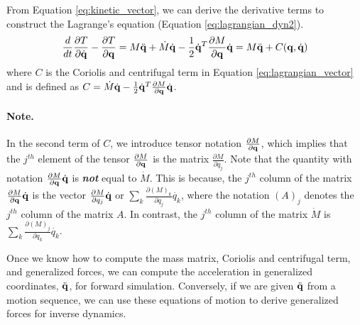 From Equation \ref{eq:kinetic_vector}, we can derive the derivative
terms to construct the Lagrange's equation (Equation
\ref{eq:lagrangian_dyn2}).
\begin{equation}
\frac{d}{dt}\frac{\partial T}{\partial \dot{\mathbf{q}}} - \frac{\partial
  T}{\partial \mathbf{q}} = M\ddot{\mathbf{q}} + \dot{M} \dot{\mathbf{q}} - \frac{1}{2}\dot{\mathbf{q}}^T \frac{\partial M}{\partial \mathbf{q}} \dot{\mathbf{q}} = M
\ddot{\mathbf{q}} + C(\mathbf{q}, \dot{\mathbf{q}})
\end{equation}
where $C$ is the Coriolis and centrifugal term in Equation
\ref{eq:lagrangian_vector} and is defined as $C = \dot{M}
\dot{\mathbf{q}} - \frac{1}{2}\dot{\mathbf{q}}^T \frac{\partial M}{\partial
  \mathbf{q}} \dot{\mathbf{q}}$. 
\paragraph{Note.} In the second term of $C$, we introduce tensor notation $\frac{\partial M}{\partial \mathbf{q}}$, which implies that the $j^{th}$ element of the tensor $\frac{\partial M}{\partial \mathbf{q}}$ is the matrix $\frac{\partial M}{\partial {q}_j}$. Note that the quantity with notation $\frac{\partial M}{\partial \mathbf{q}} \dot{\mathbf{q}}$ is \textbf{\emph{not}} equal to $\dot{M}$. This is because, the $j^{th}$ column of the matrix $\frac{\partial M}{\partial \mathbf{q}} \dot{\mathbf{q}}$ is the vector $\frac{\partial M}{\partial q_j} \dot{\mathbf{q}}$ or $\sum_k \frac{\partial (M)_k}{\partial q_j} \dot{{q}_k}$, where the notation $(A)_j$ denotes the $j^{th}$ column of the matrix $A$. In contrast, the $j^{th}$ column of the matrix $\dot{M}$ is $\sum_k \frac{\partial (M)_j}{\partial q_k} \dot{{q}_k}$.

Once we know how to compute the mass matrix, Coriolis and centrifugal
term, and generalized forces, we can compute the acceleration in
generalized coordinates, $\ddot{\mathbf{q}}$, for forward
simulation. Conversely, if we are given $\ddot{\mathbf{q}}$ from a motion
sequence, we can use these equations of motion to derive generalized
forces for inverse dynamics. 


